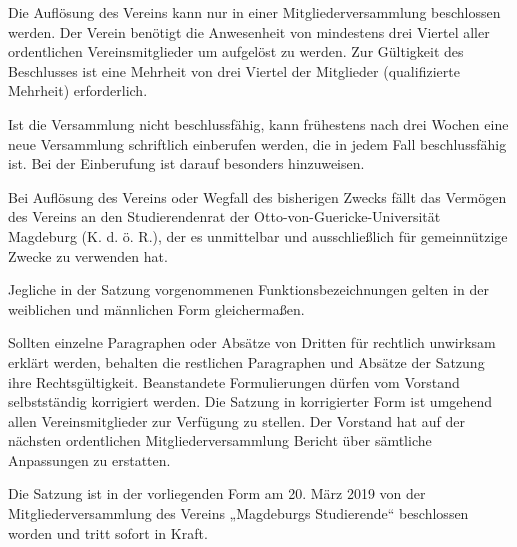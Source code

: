 \documentclass[%
    parskip=half,
]{scrartcl}
\begin{document}
	\begin{contract}
		
		
		Die Auflösung des Vereins kann nur in einer Mitgliederversammlung beschlossen werden. Der Verein benötigt die Anwesenheit von mindestens drei Viertel aller ordentlichen Vereinsmitglieder um aufgelöst zu werden. Zur Gültigkeit des Beschlusses ist eine Mehrheit von drei Viertel der Mitglieder (qualifizierte Mehrheit) erforderlich.
		
		Ist die Versammlung nicht beschlussfähig, kann frühestens nach drei Wochen eine neue Versammlung schriftlich einberufen werden, die in jedem Fall beschlussfähig ist. Bei der Einberufung ist darauf besonders hinzuweisen.
		
		Bei Auflösung des Vereins oder Wegfall des bisherigen Zwecks fällt das Vermögen des Vereins an den Studierendenrat der Otto-von-Guericke-Universität Magdeburg (K. d. ö. R.), der es unmittelbar und ausschließlich für gemeinnützige Zwecke zu verwenden hat.
		
		
		Jegliche in der Satzung vorgenommenen Funktionsbezeichnungen gelten in der weiblichen und männlichen Form gleichermaßen.
		
		
		Sollten einzelne Paragraphen oder Absätze von Dritten für rechtlich unwirksam erklärt werden, behalten die restlichen Paragraphen und Absätze der Satzung ihre Rechtsgültigkeit. Beanstandete Formulierungen dürfen vom Vorstand selbstständig korrigiert werden. Die Satzung in korrigierter Form ist umgehend allen Vereinsmitglieder zur Verfügung zu stellen. Der Vorstand hat auf der nächsten ordentlichen Mitgliederversammlung Bericht über sämtliche Anpassungen zu erstatten.
		
		
		Die Satzung ist in der vorliegenden Form am 20. März 2019 von der Mitgliederversammlung des Vereins „Magdeburgs Studierende“ beschlossen worden und tritt sofort in Kraft.
		
	\end{contract}
	
\end{document}
